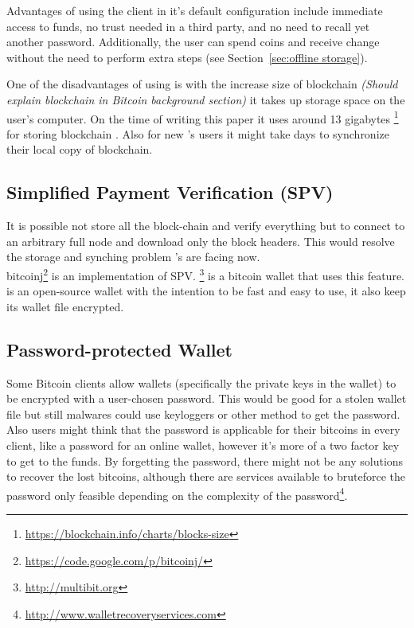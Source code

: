 Advantages of using the \bitcoinclient client in it's default configuration include immediate access to funds, no trust needed in a third party, and no need to recall yet another password. Additionally, the user can spend coins and receive change without the need to perform extra steps (see Section~\ref{sec:offline storage}). 

One of the disadvantages of using \bitcoinclient is with the increase size of blockchain \textit {(Should explain blockchain in Bitcoin background section)}  it takes up storage space on the user's computer. On the time of writing this paper it uses around 13 gigabytes \footnote{\url{https://blockchain.info/charts/blocks-size}} for storing blockchain . Also for new \bitcoinclient's users it might take days to synchronize their local copy of blockchain.
\subsection{Simplified Payment Verification (SPV)}
It is possible not store all the block-chain and verify everything but to connect to an arbitrary full node and download only the block headers. This would resolve the storage and synching problem \bitcoinclient's are facing now. \\
bitcoinj\footnote{\url {https://code.google.com/p/bitcoinj/}} is an implementation of SPV.
 \multibit \footnote{\url {http://multibit.org}} is a bitcoin wallet that uses this feature. \multibit is an open-source wallet with the intention to be fast and easy to use, it also keep its wallet file encrypted.




\subsection{Password-protected Wallet}
Some Bitcoin clients allow wallets (specifically the private keys in the wallet) to be encrypted with a user-chosen password. This would be good for a stolen wallet file but still malwares could use keyloggers or other method to get the password. Also users might think that the password is applicable for their bitcoins in every client, like a password for an online wallet, however it's more of a two factor key to get to the funds. By forgetting the password, there might not be any solutions to recover the lost bitcoins, although there are services available to bruteforce the password only feasible depending on the complexity of the password\footnote{\url {http://www.walletrecoveryservices.com}}.

